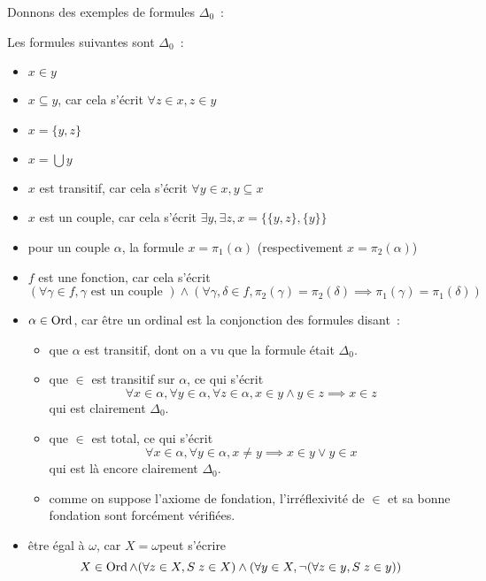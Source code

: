 Donnons des exemples de formules $\Delta_0$~:

\begin{example}
  Les formules suivantes sont $\Delta_0$~:
  \begin{itemize}
  \item $x\in y$
  \item $x\subseteq y$, car cela s'écrit $\forall z \in x, z \in y$
  \item $x = \{y,z\}$
  \item $x = \bigcup y$
  \item $x$ est transitif, car cela s'écrit $\forall y \in x, y\subseteq x$
  \item $x$ est un couple, car cela s'écrit
    $\exists y,\exists z, x = \{\{y,z\},\{y\}\}$
  \item pour un couple $\alpha$, la formule $x = \pi_1(\alpha)$
    (respectivement $x = \pi_2(\alpha)$)
  \item $f$ est une fonction, car cela s'écrit
    \[\left(\forall \gamma \in f, \gamma\text{ est un couple }\right)\land
    \left(\forall \gamma,\delta \in f, \pi_2(\gamma) = \pi_2(\delta) \implies
    \pi_1(\gamma) = \pi_1(\delta)\right) \]
  \item $\alpha \in \operatorname{Ord}$, car être un ordinal est la conjonction des formules
    disant~:
    \begin{itemize}
    \item que $\alpha$ est transitif, dont on a vu que la formule était
      $\Delta_0$.
    \item que $\in$ est transitif sur $\alpha$, ce qui s'écrit
      \[\forall x \in \alpha, \forall y \in \alpha, \forall z \in \alpha,
      x\in y \land y \in z \implies x \in z\] qui est clairement $\Delta_0$.
    \item que $\in$ est total, ce qui s'écrit
      \[\forall x \in \alpha, \forall y \in \alpha, x \neq y \implies
      x \in y \lor y \in x\] qui est là encore clairement $\Delta_0$.
    \item comme on suppose l'axiome de fondation, l'irréflexivité de $\in$ et sa
      bonne fondation sont forcément vérifiées.
    \end{itemize}
  \item être égal à $\omega$, car \og $X = \omega$\fg peut s'écrire
    \[X\in \operatorname{Ord} \land (\forall z \in X, S\;z \in X) \land
    (\forall y \in X, \lnot (\forall z \in y, S\;z \in y))\]
  \end{itemize}
\end{example}

